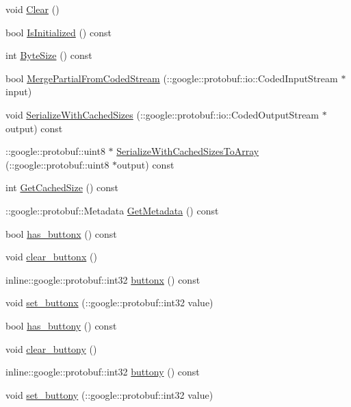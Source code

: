 \begin{DoxyCompactItemize}
\item 
void \hyperlink{class_game_menu_acb122483cb8b5048efd1852bbfba056d}{Clear} ()
\item 
bool \hyperlink{class_game_menu_aa915693f815cf5daf04471cedfb856e5}{Is\-Initialized} () const 
\item 
int \hyperlink{class_game_menu_a02d5db82aef1cc4952c969d49e708ecb}{Byte\-Size} () const 
\item 
bool \hyperlink{class_game_menu_af9f1ba343e861e93883b97e91ab8b223}{Merge\-Partial\-From\-Coded\-Stream} (\-::google\-::protobuf\-::io\-::\-Coded\-Input\-Stream $\ast$input)
\item 
void \hyperlink{class_game_menu_ad8286d01deedb8e7d8be6a538d2ec3d4}{Serialize\-With\-Cached\-Sizes} (\-::google\-::protobuf\-::io\-::\-Coded\-Output\-Stream $\ast$output) const 
\item 
\-::google\-::protobuf\-::uint8 $\ast$ \hyperlink{class_game_menu_a43ac30c609cbcda0c80ef5882bac6b11}{Serialize\-With\-Cached\-Sizes\-To\-Array} (\-::google\-::protobuf\-::uint8 $\ast$output) const 
\item 
int \hyperlink{class_game_menu_a0c6c6b9b554509c67943a875eca1ee2f}{Get\-Cached\-Size} () const 
\item 
\-::google\-::protobuf\-::\-Metadata \hyperlink{class_game_menu_aac2d5a1cf8855aa80e4e72a53397b396}{Get\-Metadata} () const 
\item 
bool \hyperlink{class_game_menu_a0f1d555993fae1f4bb4610de51082169}{has\-\_\-buttonx} () const 
\item 
void \hyperlink{class_game_menu_a200f23f0a7b562455ba4e0fe418bd751}{clear\-\_\-buttonx} ()
\item 
inline\-::google\-::protobuf\-::int32 \hyperlink{class_game_menu_aea17fc7a000f75a96a4b1b26dfd76778}{buttonx} () const 
\item 
void \hyperlink{class_game_menu_a5fdecafb0ddc1119cca7111d796ca4b1}{set\-\_\-buttonx} (\-::google\-::protobuf\-::int32 value)
\item 
bool \hyperlink{class_game_menu_aa081759411b7f4df72b589ca69fc00b2}{has\-\_\-buttony} () const 
\item 
void \hyperlink{class_game_menu_afc095342e5c7f7231d70eb99c522bbfb}{clear\-\_\-buttony} ()
\item 
inline\-::google\-::protobuf\-::int32 \hyperlink{class_game_menu_aa680aff8de83627d3659f5354fdbfa8e}{buttony} () const 
\item 
void \hyperlink{class_game_menu_a5012a247ded2ab16c4d0e9760aecbee1}{set\-\_\-buttony} (\-::google\-::protobuf\-::int32 value)

\end{DoxyCompactItemize}
